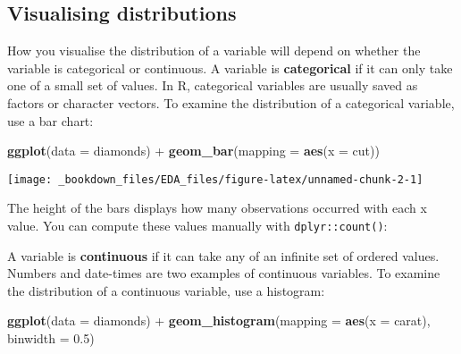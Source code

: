 \documentclass[]{book}
\newenvironment{Shaded}{\begin{snugshade}}{\end{snugshade}}
\newcommand{\KeywordTok}[1]{\textcolor[rgb]{0.13,0.29,0.53}{\textbf{{#1}}}}
\newcommand{\DataTypeTok}[1]{\textcolor[rgb]{0.13,0.29,0.53}{{#1}}}
\newcommand{\FloatTok}[1]{\textcolor[rgb]{0.00,0.00,0.81}{{#1}}}
\newcommand{\StringTok}[1]{\textcolor[rgb]{0.31,0.60,0.02}{{#1}}}
\newcommand{\CommentTok}[1]{\textcolor[rgb]{0.56,0.35,0.01}{\textit{{#1}}}}
\newcommand{\NormalTok}[1]{{#1}}
\begin{document}
\subsection{Visualising distributions}\label{visualising-distributions}

How you visualise the distribution of a variable will depend on whether
the variable is categorical or continuous. A variable is
\textbf{categorical} if it can only take one of a small set of values.
In R, categorical variables are usually saved as factors or character
vectors. To examine the distribution of a categorical variable, use a
bar chart:

\begin{Shaded}
\begin{Highlighting}[]
\KeywordTok{ggplot}\NormalTok{(}\DataTypeTok{data =} \NormalTok{diamonds) +}
\StringTok{  }\KeywordTok{geom_bar}\NormalTok{(}\DataTypeTok{mapping =} \KeywordTok{aes}\NormalTok{(}\DataTypeTok{x =} \NormalTok{cut))}
\end{Highlighting}
\end{Shaded}

\begin{center}\texttt{[image: \_bookdown\_files/EDA\_files/figure-latex/unnamed-chunk-2-1]} \end{center}

The height of the bars displays how many observations occurred with each
x value. You can compute these values manually with
\texttt{dplyr::count()}:

\begin{Shaded}
\end{Shaded}

A variable is \textbf{continuous} if it can take any of an infinite set
of ordered values. Numbers and date-times are two examples of continuous
variables. To examine the distribution of a continuous variable, use a
histogram:

\begin{Shaded}
\begin{Highlighting}[]
\KeywordTok{ggplot}\NormalTok{(}\DataTypeTok{data =} \NormalTok{diamonds) +}
\StringTok{  }\KeywordTok{geom_histogram}\NormalTok{(}\DataTypeTok{mapping =} \KeywordTok{aes}\NormalTok{(}\DataTypeTok{x =} \NormalTok{carat), }\DataTypeTok{binwidth =} \FloatTok{0.5}\NormalTok{)}
\end{Highlighting}
\end{Shaded}
\end{document}
